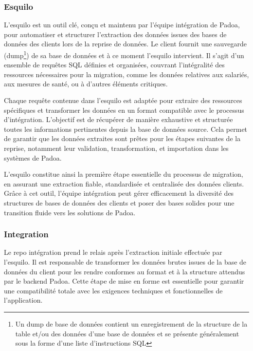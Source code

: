 \subsubsection{Esquilo}

L'esquilo est un outil clé, conçu et maintenu par l’équipe intégration de Padoa, pour automatiser et structurer l’extraction des données issues des bases de données des clients lors de la reprise de données. Le client fournit une sauvegarde (dump\footnote{Un dump de base de données contient un enregistrement de la structure de la table et/ou des données d'une base de données et se présente généralement sous la forme d'une liste d'instructions SQL\cite{wiki-dump}}) de sa base de données et à ce moment l’esquilo intervient. Il s’agit d’un ensemble de requêtes SQL définies et organisées, couvrant l’intégralité des ressources nécessaires pour la migration, comme les données relatives aux salariés, aux mesures de santé, ou à d'autres éléments critiques.

Chaque requête contenue dans l’esquilo est adaptée pour extraire des ressources spécifiques et transformer les données en un format compatible avec le processus d’intégration. L’objectif est de récupérer de manière exhaustive et structurée toutes les informations pertinentes depuis la base de données source. Cela permet de garantir que les données extraites sont prêtes pour les étapes suivantes de la reprise, notamment leur validation, transformation, et importation dans les systèmes de Padoa.

L’esquilo constitue ainsi la première étape essentielle du processus de migration, en assurant une extraction fiable, standardisée et centralisée des données clients. Grâce à cet outil, l’équipe intégration peut gérer efficacement la diversité des structures de bases de données des clients et poser des bases solides pour une transition fluide vers les solutions de Padoa.

\subsubsection{Integration}

Le repo intégration prend le relais après l’extraction initiale effectuée par l’esquilo. Il est responsable de transformer les données brutes issues de la base de données du client pour les rendre conformes au format et à la structure attendus par le backend Padoa. Cette étape de mise en forme est essentielle pour garantir une compatibilité totale avec les exigences techniques et fonctionnelles de l’application.

